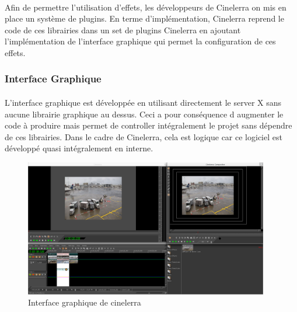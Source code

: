 \paragraph{}

Afin de permettre l'utilisation d'effets, les développeurs de Cinelerra
on mis en place un système de plugins. En terme d'implémentation,
Cinelerra reprend le code de ces librairies dans un set de plugins
Cinelerra en ajoutant l'implémentation de l'interface graphique qui
permet la configuration de ces effets.

\subsubsection{Interface Graphique}

\paragraph{}

L'interface graphique est développée en utilisant directement le server
X sans aucune librairie graphique au dessus. Ceci a pour conséquence d
augmenter le code à produire mais permet de controller intégralement
le projet sans dépendre de ces librairies.  Dans le cadre de Cinelerra,
cela est logique car ce logiciel est développé quasi intégralement
en interne.

\begin{figure} [H]

  \begin{center}

    \includegraphics[width=0.95\textwidth]{images/cinelerra}

  \end{center}

  \caption{Interface graphique de cinelerra}

  \label{Yes}

\end{figure}

